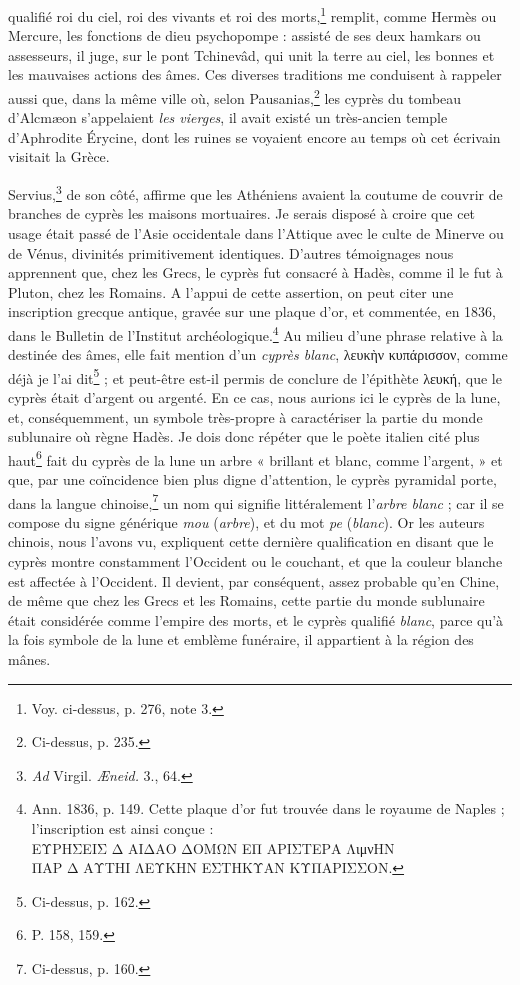 \documentclass{article}
\begin{document}
qualifié roi du ciel, roi des vivants et roi des morts,\footnote{Voy. ci-dessus, p. 276, note 3.} remplit, comme Hermès ou Mercure, les fonctions de dieu psychopompe : assisté de ses deux hamkars ou assesseurs, il juge, sur le pont Tchinevâd, qui unit la terre au ciel, les bonnes et les mauvaises actions des âmes. Ces diverses traditions me conduisent à rappeler aussi que, dans la même ville où, selon Pausanias,\footnote{Ci-dessus, p. 235.} les cyprès du tombeau d'Alcmæon s'appelaient \emph{les vierges}, il avait existé un très-ancien temple d'Aphrodite Érycine, dont les ruines se voyaient encore au temps où cet écrivain visitait la Grèce.

Servius,\footnote{\emph{Ad} Virgil. \emph{Æneid.} 3., 64.} de son côté, affirme que les Athéniens avaient la coutume de couvrir de branches de cyprès les maisons mortuaires. Je serais disposé à croire que cet usage était passé de l'Asie occidentale dans l'Attique avec le culte de Minerve ou de Vénus, divinités primitivement identiques. D'autres témoignages nous apprennent que, chez les Grecs, le cyprès fut consacré à Hadès, comme il le fut à Pluton, chez les Romains. A l'appui de cette assertion, on peut citer une inscription grecque antique, gravée sur une plaque d'or, et commentée, en 1836, dans le Bulletin de l'Institut archéologique.\footnote{Ann. 1836, p. 149. Cette plaque d'or fut trouvée dans le royaume de Naples ; l'inscription est ainsi conçue :\\\hspace*{10mm}\textgreek{ΕΥΡΗΣΕΙΣ Δ ΑΙΔΑΟ ΔΟΜΩΝ ΕΠ ΑΡΙΣΤΕΡΑ ΛιμνΗΝ\\\hspace*{10mm}ΠΑΡ Δ ΑΥΤΗΙ ΛΕΥΚΗΝ ΕΣΤΗΚΥΑΝ ΚΥΠΑΡΙΣΣΟΝ.}} Au milieu d'une phrase relative à la destinée des âmes, elle fait mention d'un \emph{cyprès blanc}, \textgreek{λευκὴν κυπάρισσον}, comme déjà je l'ai dit\footnote{Ci-dessus, p. 162.} ; et peut-être est-il permis de conclure de l'épithète \textgreek{λευκή}, que le cyprès était d'argent ou argenté. En ce cas, nous aurions ici le cyprès de la lune, et, conséquemment, un symbole très-propre à caractériser la partie du monde sublunaire où règne Hadès. Je dois donc répéter que le poète italien cité plus haut\footnote{P. 158, 159.} fait du cyprès de la lune un arbre « brillant et blanc, comme l'argent, » et que, par une coïncidence bien plus digne d'attention, le cyprès pyramidal porte, dans la langue chinoise,\footnote{Ci-dessus, p. 160.} un nom qui signifie littéralement l'\emph{arbre blanc} ; car il se compose du signe générique \emph{mou}  (\emph{arbre}), et du mot \emph{pe}  (\emph{blanc}). Or les auteurs chinois, nous l'avons vu, expliquent cette dernière qualification en disant que le cyprès montre constamment l'Occident ou le couchant, et que la couleur blanche est affectée à l'Occident. Il devient, par conséquent, assez probable qu'en Chine, de même que chez les Grecs et les Romains, cette partie du monde sublunaire était considérée comme l'empire des morts, et le cyprès qualifié \emph{blanc}, parce qu'à la fois symbole de la lune et emblème funéraire, il appartient à la région des mânes.
\end{document}
